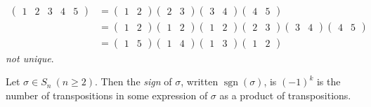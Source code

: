 \begin{example} ~\vspace*{-1.5\baselineskip}
\begin{align*}
    \begin{pmatrix}1 & 2 & 3 & 4 & 5\end{pmatrix} &= \begin{pmatrix}1 & 2\end{pmatrix} \begin{pmatrix}2 & 3\end{pmatrix} \begin{pmatrix}3 & 4\end{pmatrix} \begin{pmatrix}4 & 5\end{pmatrix} \\
    &= \begin{pmatrix}1 & 2\end{pmatrix} \begin{pmatrix}1 & 2\end{pmatrix} \begin{pmatrix}1 & 2\end{pmatrix} \begin{pmatrix}2 & 3\end{pmatrix} \begin{pmatrix}3 & 4\end{pmatrix} \begin{pmatrix}4 & 5\end{pmatrix} \\
    &= \begin{pmatrix}1 & 5\end{pmatrix} \begin{pmatrix}1 & 4\end{pmatrix} \begin{pmatrix}1 & 3\end{pmatrix} \begin{pmatrix}1 & 2\end{pmatrix}
\end{align*}
\emph{not unique}.
\end{example}

\begin{definition}
Let $\sigma \in S_n \ (n \geq 2)$.
Then the \emph{sign} of $\sigma$, written $\operatorname{sgn}(\sigma)$, is $(-1)^k$ is the number of transpositions in some expression of $\sigma$ as a product of transpositions.
\end{definition}

